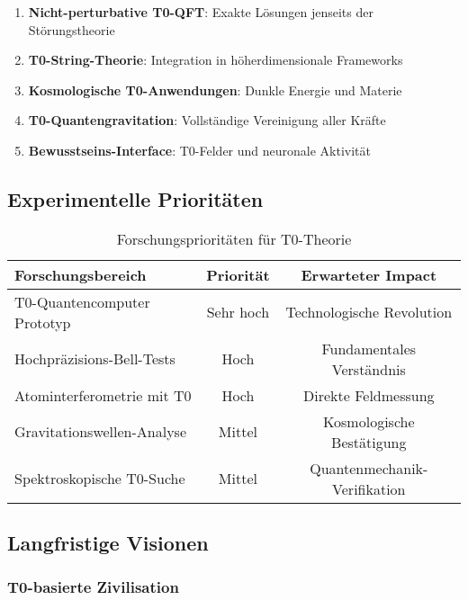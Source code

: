 \documentclass[12pt,a4paper]{article}
\begin{document}
	\begin{tcolorbox}[colback=blue!5!white,colframe=blue!75!black,title=Offene Forschungsfelder]
		\begin{enumerate}
			\item \textbf{Nicht-perturbative T0-QFT}: Exakte Lösungen jenseits der Störungstheorie
			\item \textbf{T0-String-Theorie}: Integration in höherdimensionale Frameworks  
			\item \textbf{Kosmologische T0-Anwendungen}: Dunkle Energie und Materie
			\item \textbf{T0-Quantengravitation}: Vollständige Vereinigung aller Kräfte
			\item \textbf{Bewusstseins-Interface}: T0-Felder und neuronale Aktivität
		\end{enumerate}
	\end{tcolorbox}
	
	\subsection{Experimentelle Prioritäten}
	
	\begin{table}[htbp]
		\centering
		\begin{tabular}{lcc}
			\toprule
			\textbf{Forschungsbereich} & \textbf{Priorität} & \textbf{Erwarteter Impact} \\
			\midrule
			T0-Quantencomputer Prototyp & Sehr hoch & Technologische Revolution \\
			Hochpräzisions-Bell-Tests & Hoch & Fundamentales Verständnis \\
			Atominterferometrie mit T0 & Hoch & Direkte Feldmessung \\
			Gravitationswellen-Analyse & Mittel & Kosmologische Bestätigung \\
			Spektroskopische T0-Suche & Mittel & Quantenmechanik-Verifikation \\
			\bottomrule
		\end{tabular}
		\caption{Forschungsprioritäten für T0-Theorie}
		\label{tab:research_priorities}
	\end{table}
	
	\subsection{Langfristige Visionen}
	
	\subsubsection{T0-basierte Zivilisation}
	
\end{document}
